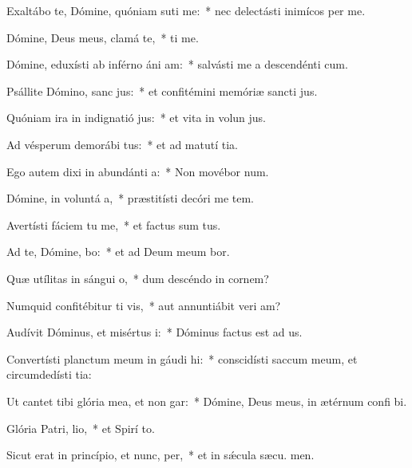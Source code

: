 \item Exaltábo te, Dómine, quóniam suti me:~* nec delectásti inimícos  per me.
\item Dómine, Deus meus, clamá  te,~*  ti me.
\item Dómine, eduxísti ab inférno áni am:~* salvásti me a descendénti  cum.
\item Psállite Dómino, sanc jus:~* et confitémini memóriæ sancti jus.
\item Quóniam ira in indignatió jus:~* et vita in volun jus.
\item Ad vésperum demorábi tus:~* et ad matutí tia.
\item Ego autem dixi in abundánti a:~* Non movébor  num.
\item Dómine, in voluntá a,~* præstitísti decóri me tem.
\item Avertísti fáciem tu  me,~* et factus sum tus.
\item Ad te, Dómine, bo:~* et ad Deum meum bor.
\item Quæ utílitas in sángui o,~* dum descéndo in cornem?
\item Numquid confitébitur ti vis,~* aut annuntiábit veri am?
\item Audívit Dóminus, et misértus  i:~* Dóminus factus est ad us.
\item Convertísti planctum meum in gáudi hi:~* conscidísti saccum meum, et circumdedísti  tia:
\item Ut cantet tibi glória mea, et non gar:~* Dómine, Deus meus, in ætérnum confi bi.
\item Glória Patri,  lio,~* et Spirí to.
\item Sicut erat in princípio, et nunc,  per,~* et in sǽcula sæcu. men.
